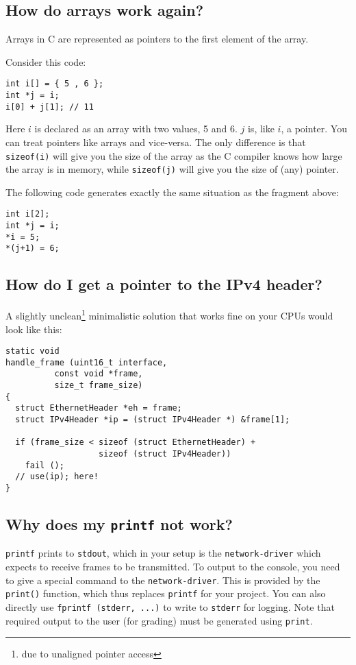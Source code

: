 \documentclass{article}
\begin{document}
\subsection{How do arrays work again?}

Arrays in C are represented as pointers to the first element of the
array.

Consider this code:
\begin{verbatim}
int i[] = { 5 , 6 };
int *j = i;
i[0] + j[1]; // 11
\end{verbatim}
Here $i$ is declared as an array with two values, 5 and 6.  $j$ is,
like $i$, a pointer.  You can treat pointers like arrays and vice-versa.
The only difference is that {\tt sizeof(i)} will give you the size of
the array as the C compiler knows how large the array is in memory, while
{\tt sizeof(j)} will give you the size of (any) pointer.

The following code generates exactly the same situation as the fragment
above:
\begin{verbatim}
int i[2];
int *j = i;
*i = 5;
*(j+1) = 6;
\end{verbatim}


\subsection{How do I get a pointer to the IPv4 header?}


A slightly unclean\footnote{due to unaligned pointer access}
minimalistic solution that works fine on your CPUs would look like
this:
\begin{verbatim}
static void
handle_frame (uint16_t interface,
	      const void *frame,
	      size_t frame_size)
{
  struct EthernetHeader *eh = frame;
  struct IPv4Header *ip = (struct IPv4Header *) &frame[1];

  if (frame_size < sizeof (struct EthernetHeader) +
                   sizeof (struct IPv4Header))
    fail ();
  // use(ip); here!
}
\end{verbatim}



\subsection{Why does my {\tt printf} not work?}

{\tt printf} prints to {\tt stdout}, which in your setup is the
{\tt network-driver} which expects to receive frames to be transmitted.
To output to the console, you need to give a special command to
the {\tt network-driver}.  This is provided by the {\tt print()} function,
which thus replaces {\tt printf} for your project.  You can
also directly use {\tt fprintf (stderr, ...)} to write to {\tt stderr}
for logging. Note that required output to the user (for grading) must
be generated using {\tt print}.
\end{document}

